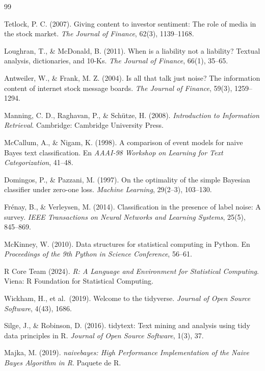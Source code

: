 \documentclass[11pt, a4paper]{article}
\begin{document}
\begin{thebibliography}{99}
\small

 Tetlock, P. C. (2007). Giving content to investor sentiment: The role of
media in the stock market. \textit{The Journal of Finance}, 62(3), 1139--1168.

 Loughran, T., \& McDonald, B. (2011). When is a liability not a liability?
Textual analysis, dictionaries, and 10-Ks. \textit{The Journal of Finance}, 66(1), 35--65.

 Antweiler, W., \& Frank, M. Z. (2004). Is all that talk just noise? The
information content of internet stock message boards. \textit{The Journal of Finance}, 59(3),
1259--1294.

 Manning, C. D., Raghavan, P., \& Schütze, H. (2008). \textit{Introduction to
Information Retrieval}. Cambridge: Cambridge University Press.

 McCallum, A., \& Nigam, K. (1998). A comparison of event models for naive
Bayes text classification. En \textit{AAAI-98 Workshop on Learning for Text Categorization},
41--48.

 Domingos, P., \& Pazzani, M. (1997). On the optimality of the simple
Bayesian classifier under zero-one loss. \textit{Machine Learning}, 29(2--3), 103--130.

 Frénay, B., \& Verleysen, M. (2014). Classification in the presence of label
noise: A survey. \textit{IEEE Transactions on Neural Networks and Learning Systems}, 25(5),
845--869.

 McKinney, W. (2010). Data structures for statistical computing in Python.
En \textit{Proceedings of the 9th Python in Science Conference}, 56--61.

 R Core Team (2024). \textit{R: A Language and Environment for Statistical
Computing}. Viena: R Foundation for Statistical Computing.

 Wickham, H., et al.\ (2019). Welcome to the tidyverse. \textit{Journal of
Open Source Software}, 4(43), 1686.

 Silge, J., \& Robinson, D. (2016). tidytext: Text mining and analysis using
tidy data principles in R. \textit{Journal of Open Source Software}, 1(3), 37.

 Majka, M. (2019). \textit{naivebayes: High Performance Implementation of the
Naive Bayes Algorithm in R}. Paquete de R.


\end{thebibliography}
\end{document}
